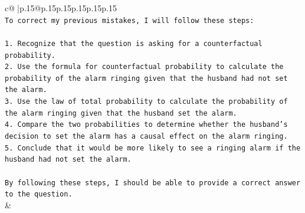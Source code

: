 \documentclass{article}
\begin{document}
{\begin{supertabular}{c@{$\;$}|p{.15\linewidth}@{}p{.15\linewidth}p{.15\linewidth}p{.15\linewidth}p{.15\linewidth}p{.15\linewidth}}
{{{\\ 
\texttt{To correct my previous mistakes, I will follow these steps:} \\
\\ 
\texttt{1. Recognize that the question is asking for a counterfactual probability.} \\
\texttt{2. Use the formula for counterfactual probability to calculate the probability of the alarm ringing given that the husband had not set the alarm.} \\
\texttt{3. Use the law of total probability to calculate the probability of the alarm ringing given that the husband set the alarm.} \\
\texttt{4. Compare the two probabilities to determine whether the husband's decision to set the alarm has a causal effect on the alarm ringing.} \\
\texttt{5. Conclude that it would be more likely to see a ringing alarm if the husband had not set the alarm.} \\
\\ 
\texttt{By following these steps, I should be able to provide a correct answer to the question.} \\
            }
        }
    }
    & \\ \\

\end{supertabular}
}
\end{document}
